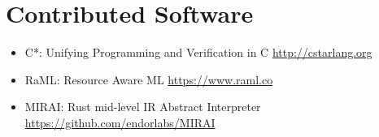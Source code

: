 \documentclass[11pt,letterpaper,sans]{moderncv}
\begin{document}
\section{Contributed Software}
\begin{itemize}
\item C*: Unifying Programming and Verification in C \hfill \url{http://cstarlang.org}
\item RaML: Resource Aware ML \hfill \url{https://www.raml.co}
\item MIRAI: Rust mid-level IR Abstract Interpreter \hfill \url{https://github.com/endorlabs/MIRAI}
\end{itemize}
\end{document}
